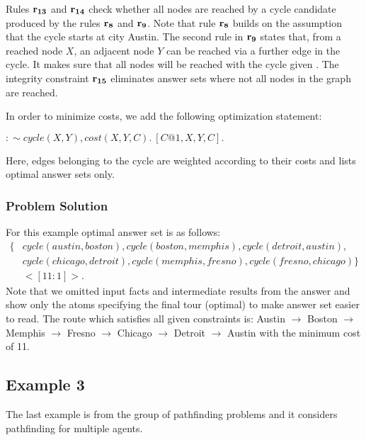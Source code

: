 \documentclass[a4paper, titlepage]{article}
\newcommand\mycenterline[1]{\par\smallskip\centerline{#1} \smallskip}
\newcommand{\row}[1]{%
  \ensuremath{\color{black}\ensuremath{\mathbf{#1}} \color{black}}%
}
\begin{document}
Rules $\row{r_{13}}$ and $\row{r_{14}}$ check whether all 
nodes 
are reached by a cycle candidate produced by the rules 
$\row{r_8}$ and $\row{r_9}$.  Note that rule $\row{r_8}$ builds on the
assumption that the cycle starts at city Austin. The second 
rule in $\row{r_9}$ states that, from a reached node $X$, an 
adjacent node $Y$ can be reached via a further edge in the 
cycle. It makes sure that all nodes will be reached with the 
cycle given \cite{gkklorst2015}. The integrity constraint $\row{r_{15}}$ 
eliminates answer sets where not all nodes in the graph are reached.

In order to minimize costs, we add the following 
optimization statement: \\
\mycenterline{$:\sim cycle(X,Y), cost(X,Y,C). \  [C@1,X,Y,C].$}
Here, edges belonging to the cycle are weighted according 
to their costs and \dlvhex{} lists optimal answer sets only.

\subsubsection{Problem Solution}
For this example optimal answer set 
is as follows:
\begin{align*}
\{&  cycle(austin,boston), 
cycle(boston,memphis),cycle(detroit,austin), \\
& cycle(chicago,detroit), 
cycle(memphis,fresno),cycle(fresno,chicago) \} \\
& <[11:1]>.
\end{align*}
Note that we omitted input facts and intermediate results from the answer and show only the atoms specifying the final tour (optimal) to make 
answer set easier to read. The route which satisfies all given constraints is: Austin $\rightarrow$ Boston $\rightarrow$ Memphis $\rightarrow$ Fresno $\rightarrow$ Chicago $\rightarrow$ Detroit $\rightarrow$ Austin with the minimum cost of 11. 




\subsection{Example 3}
\label{example3}
The last example is from the group of pathfinding problems and it considers pathfinding for multiple agents.
 
\end{document}
